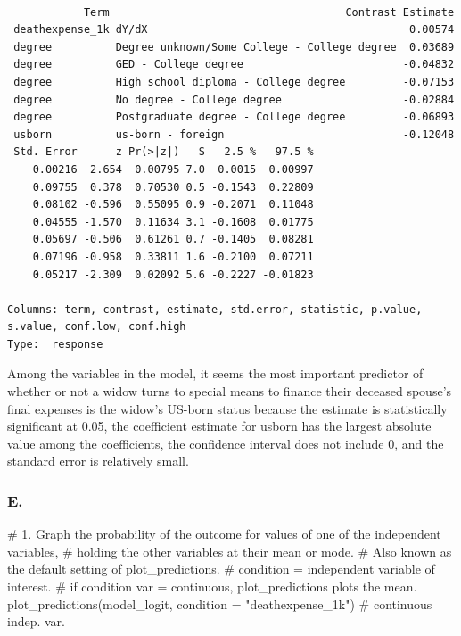 \documentclass[
  letterpaper,
  DIV=11,
  numbers=noendperiod]{scrartcl}
\newenvironment{Shaded}{\begin{snugshade}}{\end{snugshade}}
\newcommand{\AttributeTok}[1]{\textcolor[rgb]{0.40,0.45,0.13}{#1}}
\newcommand{\CommentTok}[1]{\textcolor[rgb]{0.37,0.37,0.37}{#1}}
\newcommand{\FunctionTok}[1]{\textcolor[rgb]{0.28,0.35,0.67}{#1}}
\newcommand{\NormalTok}[1]{\textcolor[rgb]{0.00,0.23,0.31}{#1}}
\newcommand{\StringTok}[1]{\textcolor[rgb]{0.13,0.47,0.30}{#1}}
\begin{document}
\begin{verbatim}

            Term                                     Contrast Estimate
 deathexpense_1k dY/dX                                         0.00574
 degree          Degree unknown/Some College - College degree  0.03689
 degree          GED - College degree                         -0.04832
 degree          High school diploma - College degree         -0.07153
 degree          No degree - College degree                   -0.02884
 degree          Postgraduate degree - College degree         -0.06893
 usborn          us-born - foreign                            -0.12048
 Std. Error      z Pr(>|z|)   S   2.5 %   97.5 %
    0.00216  2.654  0.00795 7.0  0.0015  0.00997
    0.09755  0.378  0.70530 0.5 -0.1543  0.22809
    0.08102 -0.596  0.55095 0.9 -0.2071  0.11048
    0.04555 -1.570  0.11634 3.1 -0.1608  0.01775
    0.05697 -0.506  0.61261 0.7 -0.1405  0.08281
    0.07196 -0.958  0.33811 1.6 -0.2100  0.07211
    0.05217 -2.309  0.02092 5.6 -0.2227 -0.01823

Columns: term, contrast, estimate, std.error, statistic, p.value, s.value, conf.low, conf.high 
Type:  response 
\end{verbatim}

Among the variables in the model, it seems the most important predictor
of whether or not a widow turns to special means to finance their
deceased spouse's final expenses is the widow's US-born status because
the estimate is statistically significant at 0.05, the coefficient
estimate for usborn has the largest absolute value among the
coefficients, the confidence interval does not include 0, and the
standard error is relatively small.

\subsubsection{E.}\label{e.}

\begin{Shaded}
\begin{Highlighting}[]
\CommentTok{\# 1. Graph the probability of the outcome for values of one of the independent variables, }
\CommentTok{\# holding the other variables at their mean or mode.}
\CommentTok{\# Also known as the default setting of plot\_predictions.}
\CommentTok{\# condition = independent variable of interest.}
\CommentTok{\# if condition var = continuous, plot\_predictions plots the mean.}
\FunctionTok{plot\_predictions}\NormalTok{(model\_logit, }\AttributeTok{condition =} \StringTok{"deathexpense\_1k"}\NormalTok{) }\CommentTok{\# continuous indep. var.}
\end{Highlighting}
\end{Shaded}
\end{document}
